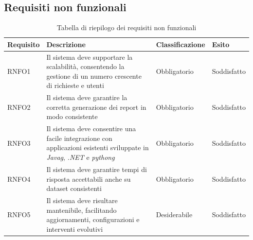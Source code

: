 \subsection{Requisiti non funzionali}
\begin{table}[H]%
            \caption{Tabella di riepilogo dei requisiti non funzionali}
            \label{tab:requisiti-non-funzionali-conclusioni}
            \begin{tabularx}{\textwidth}{|lXll|}
            \hline\hline
            \rowcolor{gray!40}
            \textbf{Requisito} & \textbf{Descrizione} & \textbf{Classificazione} & \textbf{Esito}\\
            \hline
            RNFO1    & Il sistema deve supportare la scalabilità, consentendo la gestione di un numero crescente di richieste e utenti & Obbligatorio & Soddisfatto\\
            \hline
            RNFO2    & Il sistema deve garantire la corretta generazione dei report in modo consistente & Obbligatorio & Soddisfatto\\
            \hline
            RNFO3    & Il sistema deve consentire una facile integrazione con applicazioni esistenti sviluppate in \emph{\gls{Javag}}, \emph{.NET} e \emph{\gls{pythong}} & Obbligatorio & Soddisfatto\\
            \hline
            RNFO4    & Il sistema deve garantire tempi di risposta accettabili anche su dataset consistenti & Obbligatorio & Soddisfatto\\
            \hline
            RNFO5    & Il sistema deve risultare mantenibile, facilitando aggiornamenti, configurazioni e interventi evolutivi & Desiderabile & Soddisfatto\\
            \hline
            \end{tabularx}
        \end{table}%
        

